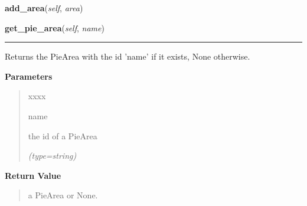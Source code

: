 \hspace{.8\funcindent}\begin{boxedminipage}{\funcwidth}

    \raggedright \textbf{add\_area}(\textit{self}, \textit{area})

\setlength{\parskip}{2ex}
\setlength{\parskip}{1ex}
    \end{boxedminipage}

    \label{pygtk_chart:pie_chart:PieChart:get_pie_area}

    \vspace{0.5ex}

\hspace{.8\funcindent}\begin{boxedminipage}{\funcwidth}

    \raggedright \textbf{get\_pie\_area}(\textit{self}, \textit{name})

    \vspace{-1.5ex}

    \rule{\textwidth}{0.5\fboxrule}
\setlength{\parskip}{2ex}
    Returns the PieArea with the id 'name' if it exists, None otherwise.

\setlength{\parskip}{1ex}
      \textbf{Parameters}
      \vspace{-1ex}

      \begin{quote}
        \begin{Ventry}{xxxx}

          \item[name]

          the id of a PieArea

            {\it (type=string)}

        \end{Ventry}

      \end{quote}

      \textbf{Return Value}
    \vspace{-1ex}

      \begin{quote}
      a PieArea or None.

      \end{quote}

    \end{boxedminipage}

